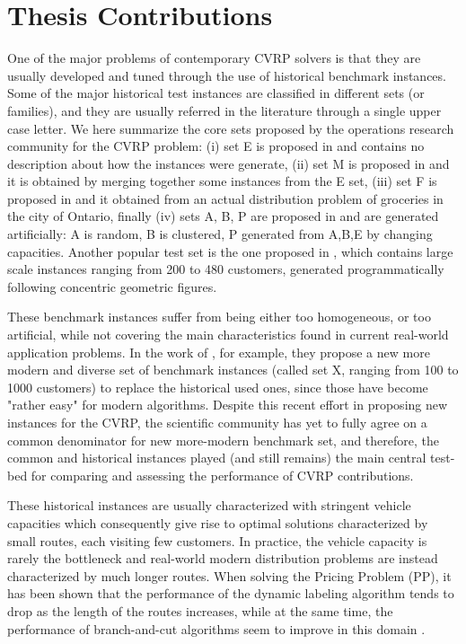 \section{Thesis Contributions}
\label{sec:intro-thesis-contributions}

One of the major problems of contemporary CVRP solvers
is that they are usually developed and tuned through the use of historical
benchmark instances.
Some of the major historical test instances are classified in different sets (or families), and
they are usually referred in the literature through a single upper case letter.
We here summarize the core sets proposed by the operations research community for the CVRP problem:
(i) set E is proposed in \textcite{christofides1969} and contains no description about how the instances were generate,
(ii) set M is proposed in \textcite{christofides1979} and it is obtained by merging together some instances from the E set,
(iii) set F is proposed in \textcite{fisher1994} and it obtained from an actual distribution problem of groceries in the city of Ontario,
finally (iv) sets A, B, P are proposed in \textcite{augerat1995} and are generated artificially: A is random, B is clustered, P generated from A,B,E by changing capacities.
Another popular test set is the one proposed in \textcite{golden1998},
which contains large scale instances ranging from 200 to 480 customers,
generated programmatically following concentric geometric figures.

These benchmark instances suffer from being either too homogeneous, or too artificial,
while not covering the main characteristics found in current real-world application problems.
In the work of \textcite{uchoa2017}, for example, they propose
a new more modern and diverse set of benchmark instances (called set X, ranging from 100 to 1000 customers)
to replace the historical used ones, since those have become "rather easy" for modern algorithms.
Despite this recent effort in proposing new instances for the CVRP, the scientific community
has yet to fully agree on a common denominator for new more-modern benchmark set, and therefore,
the common and historical instances played (and still remains) the main central test-bed for comparing
and assessing the performance of CVRP contributions.

These historical instances are usually characterized with stringent vehicle capacities
which consequently give rise to optimal solutions characterized by small routes, each visiting few customers.
In practice, the vehicle capacity is rarely the bottleneck and
real-world modern distribution problems are instead characterized by much longer routes.
When solving the Pricing Problem (PP), it has been shown that the performance of the dynamic labeling algorithm
tends to drop as the length of the routes increases,
while at the same time,
the performance of branch-and-cut algorithms seem to improve in this domain .


